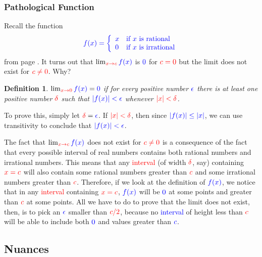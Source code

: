 \documentclass{myarticle}
\newcommand{\hor}[1]{\textcolor{red}{#1}}
\newcommand{\ver}[1]{\textcolor{blue}{#1}}
\theoremstyle{nospace}
\newtheorem*{oldattempt}{Definition}
\newenvironment{attempt}
{\begin{mdframed}\begin{oldattempt}}
    {\end{oldattempt}\end{mdframed}}
\newtheorem{old series theorem}{Theorem}
\newenvironment{series theorem}
{\begin{mdframed}\begin{old series theorem}}
    {\end{old series theorem}\end{mdframed}}
\begin{document}
\subsubsection{Pathological Function}
\label{sec:pathological function}

Recall the function
\[
  \ver{f(x) = \left\{
      \begin{array}{ll}
        x & \text{if $x$ is rational} \\
        0 & \text{if $x$ is irrational} \\
      \end{array}
    \right.}
\]
from page \pageref{eq:dirichlet}. It turns out that
$\lim_{\hor{x \to c}} \ver{f(x)}$ is $\ver{0}$ for $\hor{c = 0}$ but
the limit does not exist for $\hor{c \neq 0}$. Why?

\begin{attempt}
  $\lim_{\hor{x \to 0}} \ver{f(x)} = \ver{0}$ if for every positive
  number $\ver{\epsilon}$ there is at least one positive number
  $\hor{\delta}$ such that $\ver{|f(x)| < \epsilon}$ whenever
  $\hor{|x| < \delta}$.
\end{attempt}

To prove this, simply let $\hor{\delta} = \ver{\epsilon}$. If
$\hor{|x| < \delta}$, then since $\ver{|f(x)| \leq |x|}$, we can use
transitivity to conclude that $\ver{|f(x)| < \epsilon}$.

The fact that $\lim_{\hor{x \to c}} \ver{f(x)}$ does not exist for
$\hor{c \neq 0}$ is a consequence of the fact that every possible
interval of real numbers contains both rational numbers and irrational
numbers. This means that any \hor{interval} (of width $\hor{\delta}$,
say) containing $\hor{x = c}$ will also contain some rational numbers
greater than $\hor{c}$ and some irrational numbers greater than
$\hor{c}$. Therefore, if we look at the definition of $\ver{f(x)}$, we
notice that in any \hor{interval} containing $\hor{x = c}$,
$\ver{f(x)}$ will be $\ver{0}$ at some points and greater than
$\hor{c}$ at some points. All we have to do to prove that the limit
does not exist, then, is to pick an $\ver{\epsilon}$ smaller than
$\hor{c/2}$, because no \ver{interval} of height less than $\hor{c}$
will be able to include both $\ver{0}$ and values greater than
$\ver{c}$.

\subsection{Nuances}
\label{sec:limit definition nuances}
\end{document}
